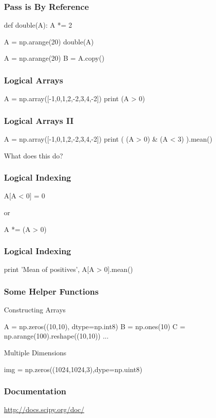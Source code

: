 \begin{frame}[fragile]
\frametitle{Pass is By Reference}

\begin{python}
def double(A):
    A *= 2

A = np.arange(20)
double(A)
\end{python}
\pause
\begin{python}
A = np.arange(20)
B = A.copy()
\end{python}
\end{frame}

\begin{frame}[fragile]
\frametitle{Logical Arrays}
\begin{python}
A = np.array([-1,0,1,2,-2,3,4,-2])
print (A > 0)
\end{python}
\end{frame}
\begin{frame}[fragile]
\frametitle{Logical Arrays II}
\begin{python}
A = np.array([-1,0,1,2,-2,3,4,-2])
print ( (A > 0) & (A < 3) ).mean()
\end{python}

What does this do?
\end{frame}

\begin{frame}[fragile]
\frametitle{Logical Indexing}
\begin{python}
A[A < 0] = 0
\end{python}
or
\begin{python}
A *= (A > 0)
\end{python}
\end{frame}


\begin{frame}[fragile]
\frametitle{Logical Indexing}

\begin{python}
print 'Mean of positives', A[A > 0].mean()
\end{python}
\end{frame}

\begin{frame}[fragile]
\frametitle{Some Helper Functions}

\begin{block}{Constructing Arrays}
\begin{python}
A = np.zeros((10,10), dtype=np.int8)
B = np.ones(10)
C = np.arange(100).reshape((10,10))
...
\end{python}
\end{block}

\begin{block}{Multiple Dimensions}
\begin{python}
img = np.zeros((1024,1024,3),dype=np.uint8)
\end{python}
\end{block}

\end{frame}


\begin{frame}[fragile]
\frametitle{Documentation}

\href{http://docs.scipy.org/doc/}{http://docs.scipy.org/doc/}

\end{frame}



